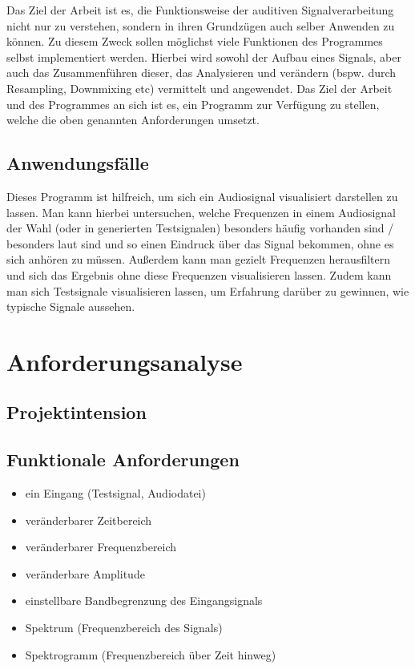 \documentclass[a4paper]{article}
\begin{document}
Das Ziel der Arbeit ist es, die Funktionsweise der auditiven Signalverarbeitung nicht nur zu verstehen, sondern in ihren Grundzügen auch selber Anwenden zu können. Zu diesem Zweck sollen möglichst viele Funktionen des Programmes selbst implementiert werden. Hierbei wird sowohl der Aufbau eines Signals, aber auch das Zusammenführen dieser, das Analysieren und verändern (bspw. durch Resampling, Downmixing etc) vermittelt und angewendet. Das Ziel der Arbeit und des Programmes an sich ist es, ein Programm zur Verfügung zu stellen, welche die oben genannten Anforderungen umsetzt.

\subsection{Anwendungsfälle}

Dieses Programm ist hilfreich, um sich ein Audiosignal visualisiert darstellen zu lassen. Man kann hierbei untersuchen, welche Frequenzen in einem Audiosignal der Wahl (oder in generierten Testsignalen) besonders häufig vorhanden sind / besonders laut sind und so einen Eindruck über das Signal bekommen, ohne es sich anhören zu müssen. Außerdem kann man gezielt Frequenzen herausfiltern und sich das Ergebnis ohne diese Frequenzen visualisieren lassen. Zudem kann man sich Testsignale visualisieren lassen, um Erfahrung darüber zu gewinnen, wie typische Signale aussehen.

\newpage
\section{Anforderungsanalyse}

\subsection{Projektintension}

\subsection{Funktionale Anforderungen}

\begin{itemize}
  \item ein Eingang (Testsignal, Audiodatei)
  \item veränderbarer Zeitbereich
  \item veränderbarer Frequenzbereich
  \item veränderbare Amplitude
  \item einstellbare Bandbegrenzung des Eingangsignals
  \item Spektrum (Frequenzbereich des Signals)
  \item Spektrogramm (Frequenzbereich über Zeit hinweg)
\end{itemize}
\end{document}
